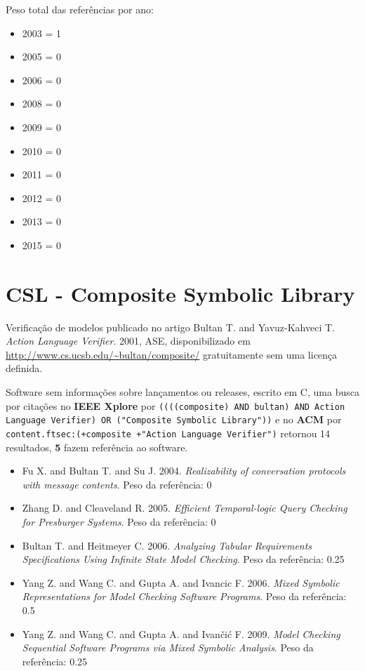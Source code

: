 Peso total das referências por ano:

\begin{itemize}
\item 2003 = 1
\item 2005 = 0
\item 2006 = 0
\item 2008 = 0
\item 2009 = 0
\item 2010 = 0
\item 2011 = 0
\item 2012 = 0
\item 2013 = 0
\item 2015 = 0
\end{itemize}


\section{CSL - Composite Symbolic Library}

Verificação de modelos
publicado no artigo
Bultan T. and Yavuz-Kahveci T.
{\it Action Language Verifier}.
2001,
ASE,
disponibilizado em \url{http://www.cs.ucsb.edu/~bultan/composite/}
gratuitamente
sem uma licença definida.

Software sem informações sobre lançamentos ou releases,
escrito em C,
uma busca por citações no {\bf IEEE Xplore} por
\texttt{((((composite) AND bultan) AND Action Language Verifier) OR ("Composite Symbolic Library"))}
e no {\bf ACM} por
\texttt{content.ftsec:(+composite +"Action Language Verifier")}
retornou
14 resultados,
{\bf 5} fazem referência ao software.

\begin{itemize}
\item Fu X. and Bultan T. and Su J.
      2004.
      {\it Realizability of conversation protocols with message contents}.
      Peso da referência: 0
\item Zhang D. and Cleaveland R.
      2005.
      {\it Efficient Temporal-logic Query Checking for Presburger Systems}.
      Peso da referência: 0
\item Bultan T. and Heitmeyer C.
      2006.
      {\it Analyzing Tabular Requirements Specifications Using Infinite State Model Checking}.
      Peso da referência: 0.25
\item Yang Z. and Wang C. and Gupta A. and Ivancic F.
      2006.
      {\it Mixed Symbolic Representations for Model Checking Software Programs}.
      Peso da referência: 0.5
\item Yang Z. and Wang C. and Gupta A. and Ivan\v{c}i\'{c} F.
      2009.
      {\it Model Checking Sequential Software Programs via Mixed Symbolic Analysis}.
      Peso da referência: 0.25
\end{itemize}

